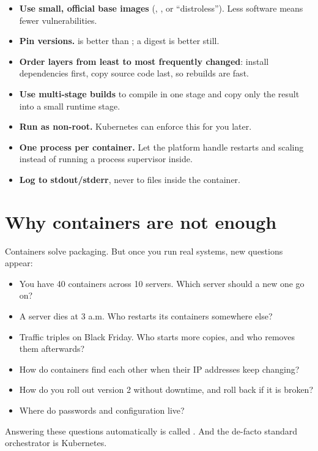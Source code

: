 \begin{itemize}
  \item \textbf{Use small, official base images} (, ,
        or ``distroless''). Less software means fewer vulnerabilities.
  \item \textbf{Pin versions.}  is better than
        ; a digest is better still.
  \item \textbf{Order layers from least to most frequently changed}: install
        dependencies first, copy source code last, so rebuilds are fast.
  \item \textbf{Use multi-stage builds} to compile in one stage and copy only
        the result into a small runtime stage.
  \item \textbf{Run as non-root.} Kubernetes can enforce this for you later.
  \item \textbf{One process per container.} Let the platform handle restarts
        and scaling instead of running a process supervisor inside.
  \item \textbf{Log to stdout/stderr}, never to files inside the container.
\end{itemize}

\section{Why containers are not enough}

Containers solve packaging. But once you run real systems, new questions appear:

\begin{itemize}
  \item You have 40 containers across 10 servers. Which server should a new one go on?
  \item A server dies at 3 a.m. Who restarts its containers somewhere else?
  \item Traffic triples on Black Friday. Who starts more copies, and who
        removes them afterwards?
  \item How do containers find each other when their IP addresses keep changing?
  \item How do you roll out version 2 without downtime, and roll back if it is broken?
  \item Where do passwords and configuration live?
\end{itemize}

Answering these questions automatically is called . And the de-facto standard orchestrator is Kubernetes.

